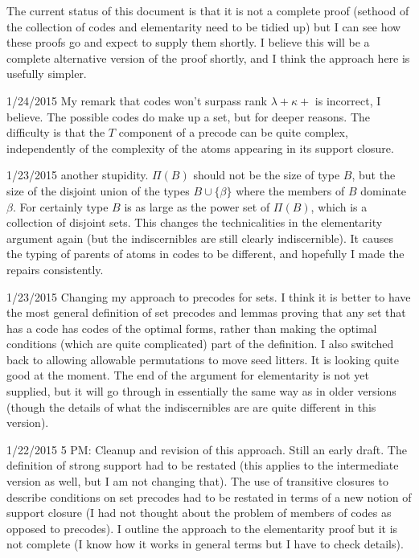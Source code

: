 \documentclass{article}
\begin{document}
The current status of this document is that it is not a complete proof (sethood of the collection of codes and elementarity need to be tidied up) but I can see how these proofs go and expect to supply them shortly.  I believe this will be a complete alternative version of the proof shortly, and I think the approach here is usefully simpler.

1/24/2015  My remark that codes won't surpass rank $\lambda + \kappa+$ is incorrect, I believe.  The possible codes do make up a set, but for deeper reasons.   The difficulty is that the $T$ component of a precode can be quite complex, independently of the complexity of the atoms appearing in its support closure.

1/23/2015  another stupidity.   $\Pi(B)$ should not be the size of type $B$, but the size of the disjoint union of the types $B \cup \{\beta\}$ where the members of $B$ dominate $\beta$.
For certainly type $B$ is as large as the power set of $\Pi(B)$, which is a collection of disjoint sets.   This changes the technicalities in the elementarity argument again (but the indiscernibles are still clearly indiscernible).   It causes the typing of parents of atoms in codes to be different, and hopefully I made the repairs consistently.

1/23/2015  Changing my approach to precodes for sets.  I think it is better to have the most general definition of set precodes and lemmas proving that any set that has
a code has codes of the optimal forms, rather than making the optimal conditions (which are quite complicated) part of the definition.  I also switched back to allowing allowable permutations to move seed litters.  It is looking quite good at the moment.   The end of the argument for elementarity is not yet supplied, but it will go through in essentially the same way as in older versions (though the details of what the indiscernibles are are quite different in this version).

1/22/2015 5 PM:  Cleanup and revision of this approach.  Still an early draft.   The definition of strong support had to be restated (this applies to the intermediate version as well, but
I am not changing that).   The use of transitive closures to describe conditions on set precodes had to be restated in terms of a new notion of support closure (I had not thought about the problem of members of codes as opposed to precodes).  I outline the approach to the elementarity proof but it is not complete (I know how it works in general terms but I have to check details).
\end{document}
